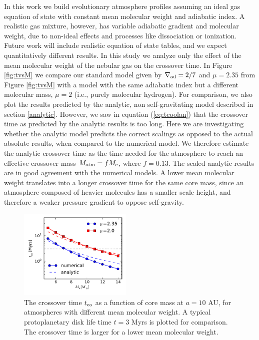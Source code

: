\documentclass[apj]{emulateapj}
\newcommand{\delad}{\nabla_{\rm ad}}
\begin{document}
 In this work we build evolutionary atmosphere profiles assuming an ideal gas equation of state with constant mean molecular weight and adiabatic index. A realistic gas mixture, however, has variable adiabatic gradient and molecular weight, due to non-ideal effects and processes like dissociation or ionization. Future work will include realistic equation of state tables, and we expect quantitatively different results. In this study we analyze only the effect of the mean molecular weight of the nebular gas on the crossover time. In Figure \ref{fig:tvsM} we compare our standard model given by $\delad=2/7$ and $\mu=2.35$ from Figure \ref{fig:tvsM} with a model with the same adiabatic index but a different molecular mass, $\mu=2$ (i.e., purely molecular hydrogen). For comparison, we also plot the results predicted by the analytic, non self-gravitating model described in section \ref{analytic}. However, we saw in equation (\ref{eq:tcoolan}) that the crossover time as predicted by the analytic results is too long. Here we are investigating whether the analytic model predicts the correct scalings as opposed to the actual absolute results, when compared to the numerical model. We therefore estimate the analytic crossover time as the time needed for the atmosphere to reach an effective crossover mass $M_{\rm{atm}}=f M_{\rm c}$, where $f = 0.13$. The scaled analytic results are in good agreement with the numerical models. A lower mean molecular weight translates into a longer crossover time for the same core mass, since an atmosphere composed of heavier molecules has a smaller scale height, and therefore a weaker pressure gradient to oppose self-gravity.  
 


\begin{figure}[h]
\centering
\includegraphics[width=0.48\textwidth]{../../figs/ModelAtmospheres/RadSelfGravPoly/PaperFigs/coolingtime_vs_Mc_10au.pdf}
\caption{The crossover time $t_{\rm{co}}$ as a function of core mass at $a=10$ AU, for atmospheres with different mean molecular weight. A typical protoplanetary disk life time $t=3$ Myrs is plotted for comparison. The crossover time is larger for a lower mean molecular weight.}
\label{fig:tvsMcomp}
\end{figure}
\end{document}
